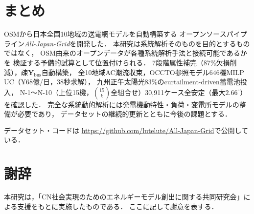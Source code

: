 \documentclass[fleqn]{ieej}
\begin{document}
\section{まとめ}

OSMから日本全国10地域の送電網モデルを自動構築する
オープンソースパイプライン\textit{All-Japan-Grid}を開発した．
本研究は系統解析そのものを目的とするものではなく，
OSM由来のオープンデータが各種系統解析手法と接続可能であるかを
検証する予備的試算として位置付けられる．
7段階属性補完（87\%欠損削減），疎$\mathbf{Y}_{\mathrm{bus}}$自動構築，
全10地域AC潮流収束，OCCTO参照モデル646機MILP UC（¥68億/日，38秒求解），
九州正午太陽光83\%のcurtailment-driven蓄電池投入，
N-1〜N-10（上位15機，$\binom{15}{k}$全組合せ）30{,}911ケース全安定（最大$2.66^\circ$）を確認した．
完全な系統動的解析には発電機動特性・負荷・変電所モデルの整備が必要であり，
データセットの継続的更新とともに今後の課題とする．

データセット・コードは
\url{https://github.com/lutelute/All-Japan-Grid}で公開している．

\section*{謝辞}

本研究は，「CN社会実現のためのエネルギーモデル創出に関する共同研究会」による支援をもとに実施したものである．
ここに記して謝意を表する．
\end{document}
